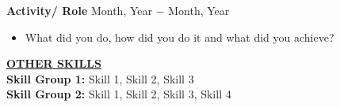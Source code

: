 \documentclass{article}
\begin{document}
	\noindent \textbf{Activity/ Role} \hfill Month, Year $-$ Month, Year
	\begin{itemize}[noitemsep,nolistsep,leftmargin=*]
		\item {What did you do, how did you do it and what did you achieve? \\}
	\end{itemize}
	
	\noindent \textbf{\underline{OTHER SKILLS}} \\
	\noindent \textbf{Skill Group 1:} Skill 1, Skill 2, Skill 3 \\
	\noindent \textbf{Skill Group 2: } Skill 1, Skill 2, Skill 3, Skill 4
	
	
\end{document}
